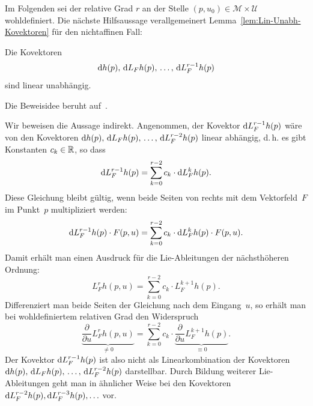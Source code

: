 Im Folgenden sei der relative Grad $r$ an der Stelle $(p,u_{0})\in\mathcal{M}\times\mathcal{U}$
wohldefiniert. Die nächste Hilfsaussage verallgemeinert Lemma~\ref{lem:Lin-Unabh-Kovektoren}
für den nicht\-affinen Fall:
\begin{lemma}
\label{lem:Lin-Unabh-Kovektoren-nichtaffin}Die Kovektoren 
\[
{\mathrm{d}} h(p),\,{\mathrm{d}} L_{F}h(p),\,\ldots,\,{\mathrm{d}} L_{F}^{r-1}h(p)
\]
sind linear unabhängig.
\end{lemma}
Die Beweisidee beruht auf~\cite[Anhang~A2]{sepulchre97}.
\begin{svmultproof2}
Wir beweisen die Aussage indirekt. Angenommen, der Kovektor ${\mathrm{d}} L_{F}^{r-1}h(p)$
wäre von den Kovektoren ${\mathrm{d}} h(p),\,{\mathrm{d}} L_{F}h(p),\,\ldots,\,{\mathrm{d}} L_{F}^{r-2}h(p)$
linear abhängig, d.\,h. es gibt Konstanten $c_{k}\in{\mathbb{R}}$, so dass
\[
{\mathrm{d}} L_{F}^{r-1}h(p)=\sum_{k=0}^{r-2}c_{k}\cdot{\mathrm{d}} L_{F}^{k}h(p).
\]
Diese Gleichung bleibt gültig, wenn beide Seiten von rechts mit dem
Vektorfeld~$F$ im Punkt~$p$ multipliziert werden:
\[
{\mathrm{d}} L_{F}^{r-1}h(p)\cdot F(p,u)=\sum_{k=0}^{r-2}c_{k}\cdot{\mathrm{d}} L_{F}^{k}h(p)\cdot F(p,u).
\]
Damit erhält man einen Ausdruck für die Lie-Ableitungen der nächsthöheren
Ordnung:
\[
L_{F}^{r}h(p,u)=\sum_{k=0}^{r-2}c_{k}\cdot L_{F}^{k+1}h(p).
\]
Differenziert man beide Seiten der Gleichung nach dem Eingang~$u$,
so erhält man bei wohldefiniertem relativen Grad den Widerspruch 
\[
\underbrace{\frac{\partial}{\partial u}L_{F}^{r}h(p,u)}_{{\displaystyle \neq0}}=\sum_{k=0}^{r-2}c_{k}\cdot\underbrace{\frac{\partial}{\partial u}L_{F}^{k+1}h(p)}_{{\displaystyle \equiv0}}.
\]
Der Kovektor ${\mathrm{d}} L_{F}^{r-1}h(p)$ ist also nicht als Linearkombination
der Kovektoren ${\mathrm{d}} h(p),\,{\mathrm{d}} L_{F}h(p),\,\ldots,\,{\mathrm{d}} L_{F}^{r-2}h(p)$
darstellbar. Durch Bildung weiterer Lie-Ableitungen geht man in ähnlicher
Weise bei den Kovektoren ${\mathrm{d}} L_{F}^{r-2}h(p),{\mathrm{d}} L_{F}^{r-3}h(p),\ldots$
vor. 
\end{svmultproof2}

